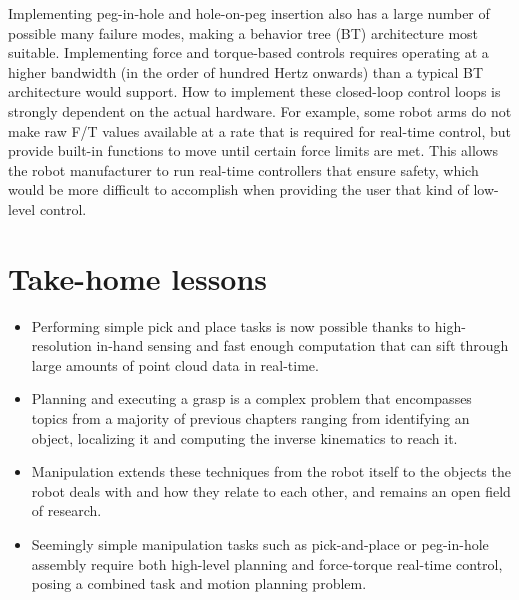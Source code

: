 Implementing peg-in-hole and hole-on-peg insertion also has a large number of possible many failure modes, making a behavior tree (BT) architecture most suitable. Implementing force and torque-based controls requires operating at a higher bandwidth (in the order of hundred Hertz onwards) than a typical BT architecture  would support. How to implement these closed-loop control loops is strongly dependent on the actual hardware. For example, some robot arms do not make raw F/T values available at a rate that is required for real-time control, but provide built-in functions to move until certain force limits are met. This allows the robot manufacturer to run real-time controllers that ensure safety, which would be more difficult to accomplish when providing the user that kind of low-level control. 



\section*{Take-home lessons}
\begin{itemize}
\item Performing simple pick and place tasks is now possible thanks to high-resolution in-hand sensing and fast enough computation that can sift through large amounts of point cloud data in real-time. 
\item Planning and executing a grasp is a complex problem that encompasses topics from a majority of previous chapters ranging from identifying an object, localizing it and computing the inverse kinematics to reach it.
\item Manipulation extends these techniques from the robot itself to the objects the robot deals with and how they relate to each other, and remains an open field of research. 
\item Seemingly simple manipulation tasks such as pick-and-place or peg-in-hole assembly require both high-level planning and force-torque real-time control, posing a combined task and motion planning problem. 
\end{itemize}

